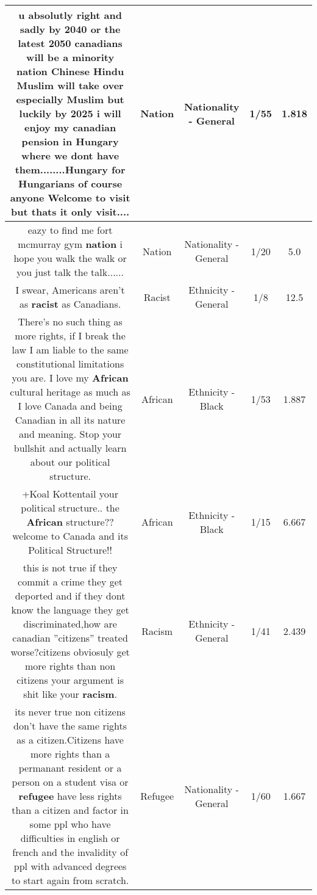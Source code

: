 \documentclass[11pt]{article}
\newlength\mylength
\begin{document}
\begin{center}
\begin{longtable}{|C{.65\mylength}|C{.30\mylength}|C{.12\mylength}|C{.12\mylength}|C{.12\mylength}|}
  \small u absolutly right and sadly by 2040 or the latest 2050 canadians will be a minority \textbf{nation} Chinese Hindu Muslim will take over especially Muslim but luckily by 2025 i will enjoy my canadian pension in Hungary where we dont have them........Hungary for Hungarians of course anyone Welcome to visit but thats it only visit....\normalsize   & Nation & Nationality - General & 1/55 & 1.818 \\  \hline
  \small eazy to find me fort mcmurray gym \textbf{nation} i hope you walk the walk or you just talk the talk......\normalsize   & Nation & Nationality - General & 1/20 & 5.0 \\  \hline
  \small I swear, Americans aren't as \textbf{racist} as Canadians.\normalsize   & Racist & Ethnicity - General & 1/8 & 12.5 \\  \hline
  \small There's no such thing as more rights, if I break the law I am liable to the same constitutional limitations you are. I love my \textbf{African} cultural heritage as much as I love Canada and being Canadian in all its nature and meaning. Stop your bullshit and actually learn about our political structure.\normalsize   & African & Ethnicity - Black & 1/53 & 1.887 \\  \hline
  \small +Koal Kottentail your political structure.. the \textbf{African} structure?? welcome to Canada and its Political Structure!!\normalsize   & African & Ethnicity - Black & 1/15 & 6.667 \\  \hline
  \small this is not true if they commit a crime they get deported and if they dont know the language they get discriminated,how are canadian ''citizens'' treated worse?citizens obviosuly get more rights than non citizens your argument is shit like your \textbf{racism}.\normalsize   & Racism & Ethnicity - General & 1/41 & 2.439 \\  \hline
  \small its never true non citizens don't have the same rights as a citizen.Citizens have more rights than a permanant resident or a person on a student visa or \textbf{refugee} have less rights than a citizen and factor in some ppl who have difficulties in english or french and the invalidity of ppl with advanced degrees to start again from scratch.\normalsize   & Refugee & Nationality - General & 1/60 & 1.667 \\  \hline

\end{longtable}
\end{center}
\end{document}
